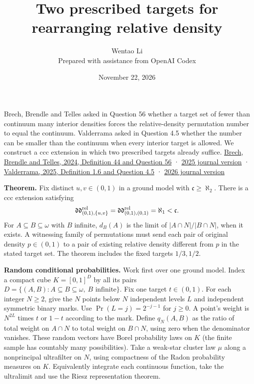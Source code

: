 \documentclass[11pt]{article}
\author{Wentao Li\\\small Prepared with assistance from OpenAI Codex}
\date{November 22, 2026}
\title{Two prescribed targets for rearranging relative density}
\begin{document}
\maketitle
Brech, Brendle and Telles asked in Question 56 whether a target set of fewer than continuum many interior densities forces the relative-density permutation number to equal the continuum. Valderrama asked in Question 4.5 whether the number can be smaller than the continuum when every interior target is allowed. We construct a ccc extension in which two prescribed targets already suffice. \href{https://arxiv.org/abs/2410.21102}{Brech, Brendle and Telles, 2024, Definition 44 and Question 56} · \href{https://doi.org/10.1112/jlms.70300}{2025 journal version} · \href{https://arxiv.org/abs/2506.21059}{Valderrama, 2025, Definition 1.6 and Question 4.5} · \href{https://doi.org/10.1007/s00153-026-01041-3}{2026 journal version}

\textbf{Theorem.} Fix distinct \(u,v\in(0,1)\) in a ground model with \(\mathfrak c\ge\aleph_2\). There is a ccc extension satisfying \[\mathfrak{dd}^{\rm rel}_{(0,1),\{u,v\}}=
\mathfrak{dd}^{\rm rel}_{(0,1),(0,1)}=\aleph_1<\mathfrak c.\] For \(A\subseteq B\subseteq\omega\) with \(B\) infinite, \(d_B(A)\) is the limit of \(|A\cap N|/|B\cap N|\), when it exists. A witnessing family of permutations must send each pair of original density \(p\in(0,1)\) to a pair of existing relative density different from \(p\) in the stated target set. The theorem includes the fixed targets \(1/3,1/2\).

\textbf{Random conditional probabilities.} Work first over one ground model. Index a compact cube \(K=[0,1]^D\) by all its pairs \(D=\{(A,B): A\subseteq B\subseteq\omega,\ B\text{ infinite}\}\). Fix one target \(t\in(0,1)\). For each integer \(N\ge2\), give the \(N\) points below \(N\) independent levels \(L\) and independent symmetric binary marks. Use \(\Pr(L=j)=2^{-j-1}\) for \(j\ge0\). A point's weight is \(N^{2L}\) times \(t\) or \(1-t\) according to the mark. Define \(q_N(A,B)\) as the ratio of total weight on \(A\cap N\) to total weight on \(B\cap N\), using zero when the denominator vanishes. These random vectors have Borel probability laws on \(K\) (the finite sample has countably many possibilities). Take a weak-star cluster law \(\mu\) along a nonprincipal ultrafilter on \(N\), using compactness of the Radon probability measures on \(K\). Equivalently integrate each continuous function, take the ultralimit and use the Riesz representation theorem.
\end{document}
